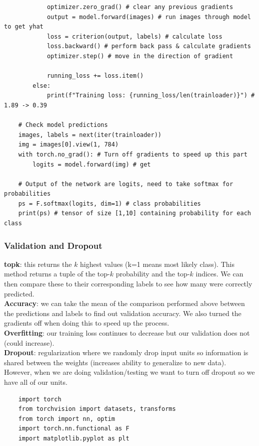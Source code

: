 \documentclass[11pt, a4paper]{article}
\begin{document}
\begin{spacing}{1.1}
\begin{lstlisting}
			optimizer.zero_grad() # clear any previous gradients
			output = model.forward(images) # run images through model to get yhat
			loss = criterion(output, labels) # calculate loss
			loss.backward() # perform back pass & calculate gradients
			optimizer.step() # move in the direction of gradient
			
			running_loss += loss.item()
		else:
			print(f"Training loss: {running_loss/len(trainloader)}") # 1.89 -> 0.39
	
	# Check model predictions
	images, labels = next(iter(trainloader))
	img = images[0].view(1, 784)
	with torch.no_grad(): # Turn off gradients to speed up this part
		logits = model.forward(img) # get 
	
	# Output of the network are logits, need to take softmax for probabilities
	ps = F.softmax(logits, dim=1) # class probabilities
	print(ps) # tensor of size [1,10] containing probability for each class
	\end{lstlisting} \newpage

	\subsubsection{Validation and Dropout}
	\textbf{topk}: this returns the $k$ highest values (k=1 means most likely class). This method returns a tuple of the top-$k$ probability and the top-$k$ indices. We can then compare these to their corresponding labels to see how many were correctly predicted. \vspace*{2mm}\\
	\textbf{Accuracy}: we can take the mean of the comparison performed above between the predictions and labels to find out validation accuracy. We also turned the gradients off when doing this to speed up the process.\vspace*{2mm}\\
	\textbf{Overfitting}: our training loss continues to decrease but our validation does not (could increase).\vspace*{2mm}\\
	\textbf{Dropout}: regularization where we randomly drop input units so information is shared between the weights (increases ability to generalize to new data). However, when we are doing validation/testing we want to turn off dropout so we have all of our units.
	\begin{lstlisting}
	import torch
	from torchvision import datasets, transforms
	from torch import nn, optim
	import torch.nn.functional as F
	import matplotlib.pyplot as plt
	

\end{lstlisting}
\end{spacing}
\end{document}
